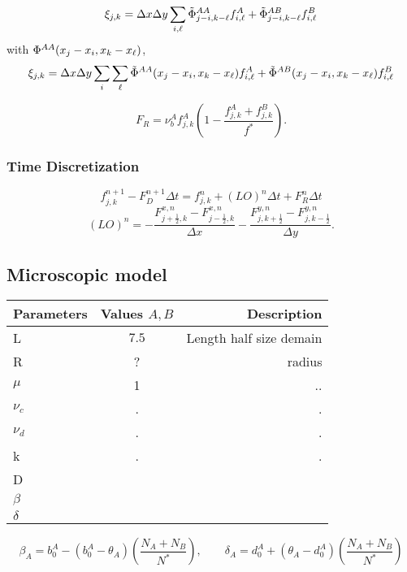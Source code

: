 $$ \xi_{j,k}=\Delta x \Delta y \sum_{i,{\ell}} \tilde{\Phi}^{AA}_{j-i,k-{\ell}} f^{A}_{i,{\ell}}+
\tilde{\Phi}^{AB}_{j-i,k-{\ell}} f^{B}_{i,{\ell}} $$
with ${\Phi}^{AA}(x_j-x_i,x_k-x_{{\ell}})$,
$$ \xi_{j,k}=\Delta x \Delta y \sum_{i} \sum_{{\ell}} \tilde{\Phi}^{AA}(x_{j}-x_{i},x_{k}-x_{{\ell}}) f^{A}_{i,{\ell}}+
\tilde{\Phi}^{AB}(x_{j}-x_{i},x_{k}-x_{{\ell}}) f^{B}_{i,{\ell}} $$

$$ F_R=\nu_b^{A}f^{A}_{j,k}\left(1-\frac{f^{A}_{j,k}+f^{B}_{j,k}}{f^{*}}\right). $$


\subsubsection{Time Discretization}
\begin{equation}
	f_{j,k}^{n+1}-F_{D}^{n+1} \Delta t= f_{j,k}^{n}+(LO)^{n} \Delta t + F_{R}^{n} \Delta t
\end{equation}
 $$(LO)^{n}=-\frac{F^{x,n}_{j+\frac{1}{2},k}-F^{x,n}_{j-\frac{1}{2},k}}{\Delta x}-\frac{F^{y,n}_{j,k+\frac{1}{2}}-F^{y,n}_{j,k-\frac{1}{2}}}{\Delta y}.	$$
\subsection{Microscopic model}



	\begin{center}
	\begin{tabular}{ l | c | r }
		\hline
		Parameters & Values $A, B$ & Description \\ \hline
		L & $7.5$ & Length half size demain  \\ 
		R & ? &  radius \\
	
		$\mu$ & 1  & ..\\
		$\nu_c$  & .&  . \\
		$\nu_d$  & .&  . \\
		k & . & .\\
		D & & \\
		$\beta$ & & \\
		$\delta$ & & \\

		\hline
	\end{tabular}
\end{center}	

\begin{equation}
\beta_{A}=b_{0}^{A}-(b_{0}^{A}-\theta_{A})\left(\frac{N_A+N_B}{N^{*}}\right), \quad\quad \delta_{A}=d_{0}^{A}+(\theta_{A}-d_{0}^{A})\left(\frac{N_A+N_B}{N^{*}}\right)
\end{equation}


